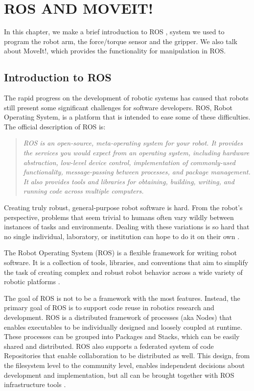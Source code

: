 \chapter{ROS AND MOVEIT!}
\label{ch:ROS AND MOVEIT!}
In this chapter, we make a brief introduction to ROS \cite{o2014gentle}, system we used to program the robot arm, the force/torque sensor and the gripper. We also talk about MoveIt!, which provides the functionality for manipulation in ROS.

\section{Introduction to ROS}
The rapid progress on the development of robotic systems has caused that robots still present some significant challenges for software developers. ROS, Robot Operating System, is a platform that is intended to ease some of these difficulties. The official description of ROS is:
\begin{quote}
\textit{ROS is an open-source, meta-operating system for your robot. It provides the services you would expect from an operating system, including hardware abstraction, low-level device control, implementation of commonly-used functionality, message-passing between processes, and package management. It also provides tools and libraries for obtaining, building, writing, and running code across multiple computers. \cite{o2014gentle}}
\end{quote}

Creating truly robust, general-purpose robot software is hard. From the robot's perspective, problems that seem trivial to humans often vary wildly between instances of tasks and environments. Dealing with these variations is so hard that no single individual, laboratory, or institution can hope to do it on their own \cite{ros}.

The Robot Operating System (ROS) is a flexible framework for writing robot software. It is a collection of tools, libraries, and conventions that aim to simplify the task of creating complex and robust robot behavior across a wide variety of robotic platforms \cite{cashmore2015rosplan}.

The goal of ROS is not to be a framework with the most features. Instead, the primary goal of ROS is to support code reuse in robotics research and development. ROS is a distributed framework of processes (aka Nodes) that enables executables to be individually designed and loosely coupled at runtime. These processes can be grouped into Packages and Stacks, which can be easily shared and distributed. ROS also supports a federated system of code Repositories that enable collaboration to be distributed as well. This design, from the filesystem level to the community level, enables independent decisions about development and implementation, but all can be brought together with ROS infrastructure tools \cite{wikiros}.

